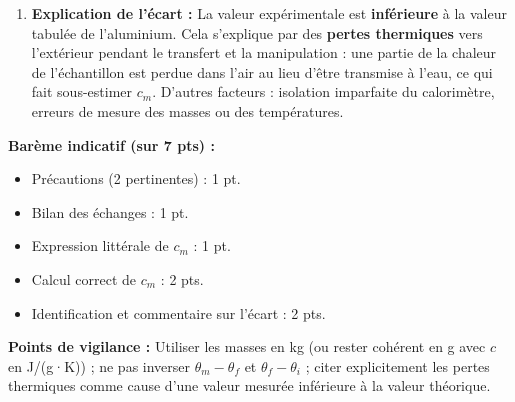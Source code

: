 \documentclass[11pt]{article}
\begin{document}
\begin{corrige}
\begin{enumerate}
\item \textbf{Explication de l'écart :} La valeur expérimentale est \textbf{inférieure} à la valeur tabulée de l'aluminium. Cela s'explique par des \textbf{pertes thermiques} vers l'extérieur pendant le transfert et la manipulation : une partie de la chaleur de l'échantillon est perdue dans l'air au lieu d'être transmise à l'eau, ce qui fait sous-estimer $c_m$. D'autres facteurs : isolation imparfaite du calorimètre, erreurs de mesure des masses ou des températures.
\end{enumerate}
\textbf{Barème indicatif (sur 7 pts) :}
\begin{itemize}
\item Précautions (2 pertinentes) : 1 pt.
\item Bilan des échanges : 1 pt.
\item Expression littérale de $c_m$ : 1 pt.
\item Calcul correct de $c_m$ : 2 pts.
\item Identification et commentaire sur l'écart : 2 pts.
\end{itemize}
\textbf{Points de vigilance :} Utiliser les masses en kg (ou rester cohérent en g avec $c$ en J/(g·K)) ; ne pas inverser $\theta_m - \theta_f$ et $\theta_f - \theta_i$ ; citer explicitement les pertes thermiques comme cause d'une valeur mesurée inférieure à la valeur théorique.
\end{corrige}
\end{document}

